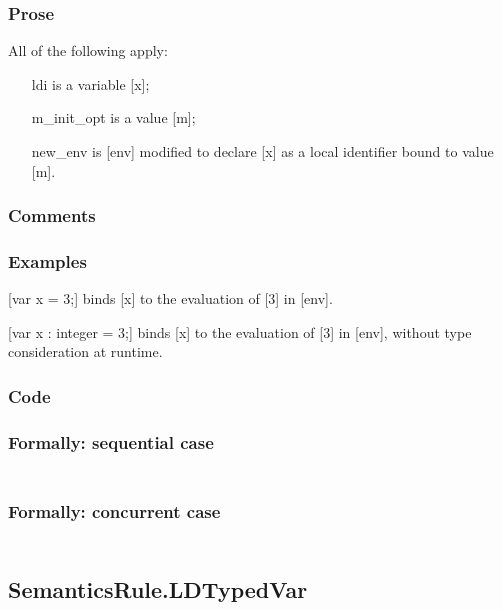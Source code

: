 \documentclass{book}
\begin{document}
    \subsubsection{Prose}
    All of the following apply:
    \begin{itemize}
    \item [ldi] is a variable [x];
    \item [m\_init\_opt] is a value [m];
    \item [new\_env] is [env] modified to declare [x] as a local identifier bound to
      value [m].
    \end{itemize}

    \subsubsection{Comments}

    \subsubsection{Examples}
    [var x = 3;] binds [x] to the evaluation of [3] in [env].

    [var x : integer = 3;] binds [x] to the evaluation of [3] in [env], without
    type consideration at runtime.

  \subsubsection{Code}

  \subsubsection{Formally: sequential case}
  \begin{align}
  \end{align} 

  \subsubsection{Formally: concurrent case}
  \begin{align}
  \end{align} 

\subsection{SemanticsRule.LDTypedVar \label{sec:SemanticsRule.LDTypedVar}}
\end{document}
